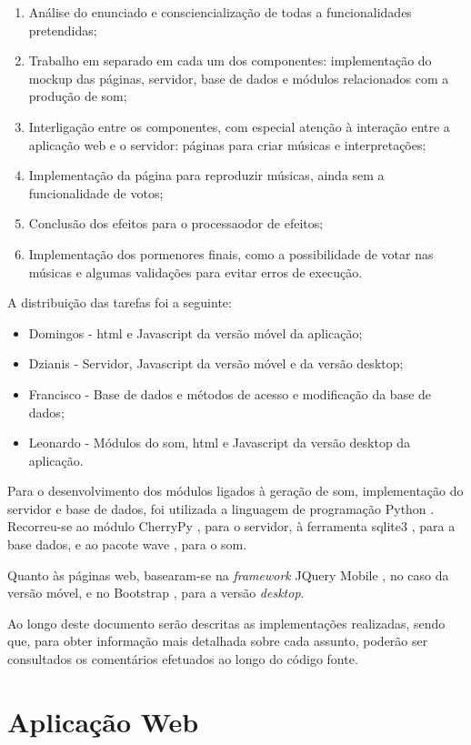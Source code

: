 \documentclass{report}
\begin{document}
\begin{enumerate}
\item Análise do enunciado e consciencialização de todas a funcionalidades pretendidas;
\item Trabalho em separado em cada um dos componentes: implementação do mockup das páginas, servidor, base de dados e módulos relacionados com a produção de som;
\item Interligação entre os componentes, com especial atenção à interação entre a aplicação web e o servidor: páginas para criar músicas e interpretações;
\item Implementação da página para reproduzir músicas, ainda sem a funcionalidade de votos;
\item Conclusão dos efeitos para o processaodor de efeitos;
\item Implementação dos pormenores finais, como a possibilidade de votar nas músicas e algumas validações para evitar erros de execução.
\end{enumerate}

A distribuição das tarefas foi a seguinte:
\begin{itemize}
\item Domingos - \ac{html} e Javascript da versão móvel da aplicação;
\item Dzianis - Servidor, Javascript da versão móvel e da versão desktop;
\item Francisco - Base de dados e métodos de acesso e modificação da base de dados;
\item Leonardo - Módulos do som, \ac{html} e Javascript da versão desktop da aplicação.
\end{itemize}

Para o desenvolvimento dos módulos ligados à geração de som, implementação do servidor e base de dados, foi utilizada a linguagem de programação Python \cite{python}. Recorreu-se ao módulo CherryPy \cite{cherry}, para o servidor, à ferramenta sqlite3 \cite{sqlite}, para a base dados, e ao pacote wave \cite{wave}, para o som.

Quanto às páginas web, basearam-se na \emph{framework} JQuery Mobile \cite{jquery}, no caso da versão móvel, e no Bootstrap \cite{bootstrap}, para a versão \emph{desktop}.

Ao longo deste documento serão descritas as implementações realizadas, sendo que, para obter informação mais detalhada sobre cada assunto, poderão ser consultados os comentários efetuados ao longo do código fonte.

\chapter{Aplicação Web}
\label{chap.aplicacao}
\end{document}
